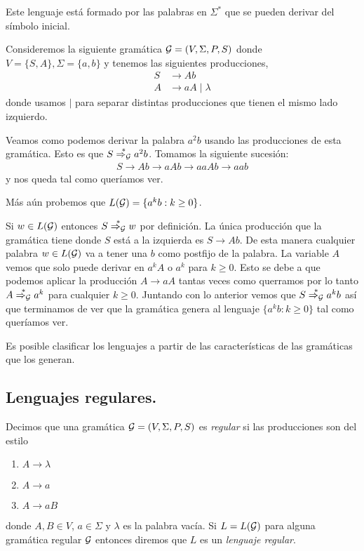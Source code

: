\documentclass[tesis.tex]{subfiles}
\begin{document}
Este lenguaje está formado por las palabras en $\Sigma^*$ que se pueden derivar del símbolo inicial. 

\medskip
\begin{ej}\label{gramatica-regular}
	Consideremos la siguiente gramática ${\cal G} = (V, \Sigma, P, S)$ donde $V = \{ S, A \}, \Sigma = \{ a,b \}$ y tenemos las siguientes producciones,
	\begin{align*}
		S & \to Ab \\
		A & \to aA \mid \lambda 
	\end{align*}
	donde usamos $\mid$ para separar distintas producciones que tienen el mismo lado izquierdo.
	
	Veamos como podemos derivar la palabra $a^2b$ usando las producciones de esta gramática. 
	Esto es que $S \overset{*}{\Rightarrow_{\cal G}} a^2b$.
	Tomamos la siguiente sucesión:
	\begin{align*}
		S \to Ab \to aAb \to aaAb \to aab
	\end{align*} 
	y nos queda tal como queríamos ver.
	
	Más aún probemos que $L({\cal G}) = \{ a^{k}b : k \ge 0 \}$. 
	
	Si $w \in L(\cal G)$ entonces $S \overset{*}{\Rightarrow_{\cal G}} w$ por definición. 
	La única producción que la gramática tiene donde $S$ está a la izquierda es $S \to Ab$. 
	De esta manera cualquier palabra $w \in L(\cal G)$ va a tener una $b$ como postfijo de la palabra. 
	La variable $A$ vemos que solo puede derivar en $a^{k}A$ o $a^{k}$ para $k \ge 0$.
	Esto se debe a que podemos aplicar la producción $A \to aA$ tantas veces como querramos por lo tanto $A \overset{*}{\Rightarrow_{\cal G}} a^k$ para cualquier $k \ge 0$.
	Juntando con lo anterior vemos que $S \overset{*}{\Rightarrow_{\cal G}} a^{k}b$ así que terminamos de ver que la gramática genera al lenguaje $\{a^kb : k \ge 0\}$ tal como queríamos ver.
\end{ej}



Es posible clasificar los lenguajes a partir de las características de las gramáticas que los generan. 

\subsection{Lenguajes regulares.}

\begin{deff}
	Decimos que una gramática ${\cal G} = (V, \Sigma, P, S)$ es \emph{regular} si las producciones son del estilo
	\begin{enumerate}
		\item $A \to \lambda$
		\item $A \to a$
		\item $A \to a B$
	\end{enumerate}
	donde $A, B \in V$, $a \in \Sigma$ y $\lambda$ es la palabra vacía. 
	Si $L=L({\cal G})$ para alguna gramática regular $\cal G$ entonces diremos que $L$ es un \emph{lenguaje regular}. 
\end{deff}
\end{document}
